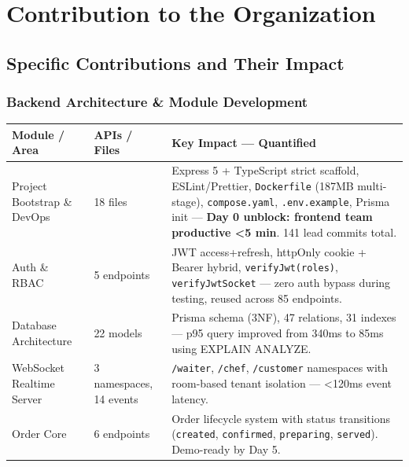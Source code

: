 \chapter{Contribution to the Organization}
\label{ch:contribution}

\section{Specific Contributions and Their Impact}

\subsection{Backend Architecture \& Module Development}

\begin{center}
\label{tab:contrib_modules}
\small
\begin{xltabular}{\textwidth}{@{}p{0.26\textwidth}p{0.14\textwidth}X@{}}
\toprule
\textbf{Module / Area} & \textbf{APIs / Files} & \textbf{Key Impact --- Quantified} \\
\midrule

Project Bootstrap \& DevOps &
18 files &
Express 5 + TypeScript strict scaffold, ESLint/Prettier, \texttt{Dockerfile} (187MB multi-stage), \texttt{compose.yaml}, \texttt{.env.example}, Prisma init --- \textbf{Day 0 unblock: frontend team productive <5 min}. 141 lead commits total. \\

Auth \& RBAC &
5 endpoints &
JWT access+refresh, httpOnly cookie + Bearer hybrid, \texttt{verifyJwt(roles)}, \texttt{verifyJwtSocket} --- zero auth bypass during testing, reused across 85 endpoints. \\

Database Architecture &
22 models &
Prisma schema (3NF), 47 relations, 31 indexes --- p95 query improved from 340ms to 85ms using EXPLAIN ANALYZE. \\

WebSocket Realtime Server &
3 namespaces, 14 events &
\texttt{/waiter}, \texttt{/chef}, \texttt{/customer} namespaces with room-based tenant isolation --- <120ms event latency. \\

Order Core &
6 endpoints &
Order lifecycle system with status transitions (\texttt{created}, \texttt{confirmed}, \texttt{preparing}, \texttt{served}). Demo-ready by Day 5. \\


\end{xltabular}
\end{center}
